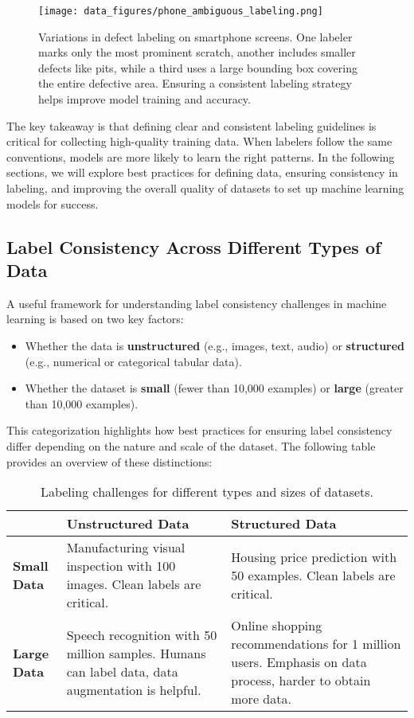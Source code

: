 \documentclass[12pt,openany]{book}
\begin{document}
\begin{figure}[H]
    \centering
    \texttt{[image: data\_figures/phone\_ambiguous\_labeling.png]}
    \caption{Variations in defect labeling on smartphone screens. One labeler marks only the most prominent scratch, another includes smaller defects like pits, while a third uses a large bounding box covering the entire defective area. Ensuring a consistent labeling strategy helps improve model training and accuracy.}
    \label{fig:phone_ambiguous_labeling}
\end{figure}

The key takeaway is that defining clear and consistent labeling guidelines is critical for collecting high-quality training data. When labelers follow the same conventions, models are more likely to learn the right patterns. In the following sections, we will explore best practices for defining data, ensuring consistency in labeling, and improving the overall quality of datasets to set up machine learning models for success.

\subsection{Label Consistency Across Different Types of Data}

A useful framework for understanding label consistency challenges in machine learning is based on two key factors:
\begin{itemize}
    \item Whether the data is \textbf{unstructured} (e.g., images, text, audio) or \textbf{structured} (e.g., numerical or categorical tabular data).
    \item Whether the dataset is \textbf{small} (fewer than 10,000 examples) or \textbf{large} (greater than 10,000 examples).
\end{itemize}

This categorization highlights how best practices for ensuring label consistency differ depending on the nature and scale of the dataset. The following table provides an overview of these distinctions:

\begin{table}[H]
    \centering
    \renewcommand{\arraystretch}{1.5}
    \caption{Labeling challenges for different types and sizes of datasets.}
    \begin{tabular}{|p{3.5cm}|p{5.5cm}|p{5.5cm}|}
        \hline
        \textbf{} & \textbf{Unstructured Data} & \textbf{Structured Data} \\
        \hline
        \textbf{Small Data} & Manufacturing visual inspection with 100 images. Clean labels are critical.  & Housing price prediction with 50 examples. Clean labels are critical. \\
        \hline
        \textbf{Large Data} & Speech recognition with 50 million samples. Humans can label data, data augmentation is helpful. & Online shopping recommendations for 1 million users. Emphasis on data process, harder to obtain more data. \\
        \hline
    \end{tabular}
    \label{tab:label_consistency_framework}
\end{table}
\end{document}
